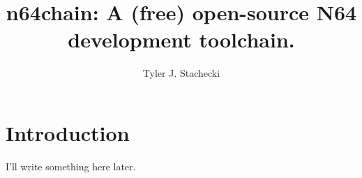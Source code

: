 \documentclass [12pt, letterpaper]{article}
\begin{document}
\title{n64chain: A (free) open-source N64 development toolchain.}
\author{Tyler J. Stachecki}
\maketitle
\pagebreak

\section{Introduction}
I'll write something here later.



\end{document}
